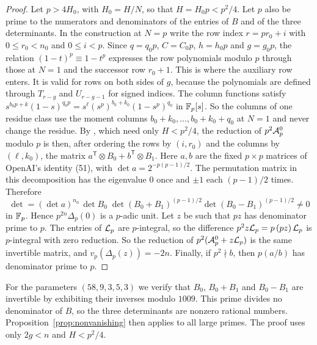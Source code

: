 \begin{proof}
Let $p>4H_0$, with $H_0=H/N$, so that $H=H_0p<p^2/4$. Let $p$ also be prime to the numerators and
denominators of the entries of $B$ and of the three determinants. In the construction at $N=p$ write the
row index $r=pr_0+i$ with $0\le r_0<n_0$ and $0\le i<p$. Since $q=q_0p$, $C=C_0p$, $h=h_0p$ and $g=g_0p$,
the relation $(1-t)^{p}\equiv1-t^p$ expresses the row polynomials modulo $p$ through those at $N=1$ and the
successor row $r_0+1$. This is where the auxiliary row enters. It is valid for rows on both sides of $g$,
because the polynomials are defined through $T_{r-g}$ and $U_{r-g-1}$ for signed indices. The column
functions satisfy $s^{b_0p+k}(1-s)^{q_0p}=s^{\ell}(s^p)^{b_0+k_0}(1-s^p)^{q_0}$ in $\mathbb F_p[s]$. So the
columns of one residue class use the moment columns $b_0+k_0,\dots,b_0+k_0+q_0$ at $N=1$ and never change
the residue. By \cite[Lemma~3.1 and eqs.~(31), (35), (36)]{OpenAI2026}, which need only $H<p^2/4$, the
reduction of $p^2\mathcal A^0_p$ modulo $p$ is then, after ordering the rows by $(i,r_0)$ and the columns by
$(\ell,k_0)$, the matrix $a^{\mathsf T}\otimes B_0+b^{\mathsf T}\otimes B_1$. Here $a,b$ are the fixed
$p\times p$ matrices of OpenAI's identity (51), with $\det a=2^{-p(p-1)/2}$. The permutation matrix in this
decomposition has the eigenvalue $0$ once and $\pm1$ each $(p-1)/2$ times. Therefore
\[
 \det=(\det a)^{n_0}\,\det B_0\;\det(B_0+B_1)^{(p-1)/2}\det(B_0-B_1)^{(p-1)/2}\ne0
\]
in $\mathbb F_p$. Hence $p^{2n}\Delta_p(0)$ is a $p$-adic unit. Let $z$ be such that $pz$ has denominator prime to
$p$. The entries of $\mathcal L_p$ are $p$-integral, so the difference $p^2z\mathcal L_p=p\,(pz)\,\mathcal L_p$ is $p$-integral
with zero reduction. So the reduction of $p^2(\mathcal A^0_p+z\mathcal L_p)$ is the same invertible matrix, and
$v_p(\Delta_p(z))=-2n$. Finally, if $p^2\nmid b$, then $p(a/b)$ has denominator prime to $p$.
\end{proof}

For the parameters $(58,9,3,5,3)$ we verify that $B_0$, $B_0+B_1$ and $B_0-B_1$ are invertible by exhibiting
their inverses modulo $1009$. This prime divides no denominator of $B$, so the three determinants are
nonzero rational numbers. Proposition~\ref{prop:nonvanishing} then applies to all large primes. The proof
uses only $2g<n$ and $H<p^2/4$.
